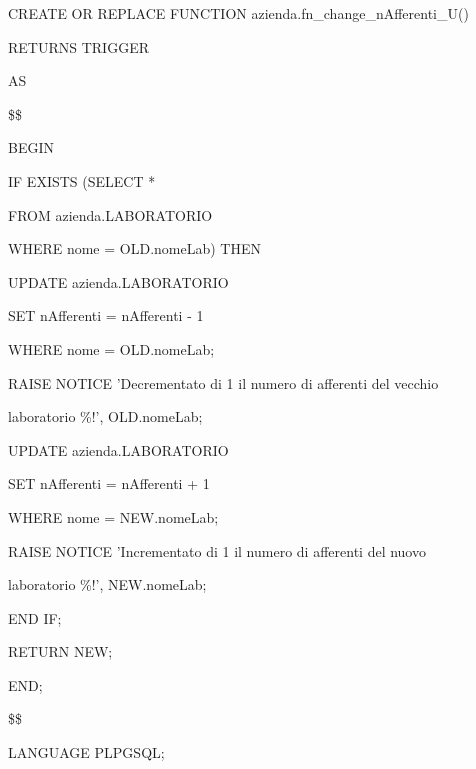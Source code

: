     \ttfamily
        \begin{flushleft}
            \begin{description}
                \item CREATE OR REPLACE FUNCTION azienda.fn\_change\_nAfferenti\_U()
                \item RETURNS TRIGGER
                \item AS
                \item \$\$
                \item BEGIN
                \begin{description}
                    \item IF EXISTS (SELECT *
                    \item \hspace{1.85cm} FROM azienda.LABORATORIO
                    \item \hspace{1.85cm} WHERE nome = OLD.nomeLab) THEN
                    \vspace{0.455cm}
                    \begin{description}
                        \item UPDATE azienda.LABORATORIO
                        \item SET nAfferenti = nAfferenti - 1
                        \item WHERE nome = OLD.nomeLab;
                        \item
                        \item RAISE NOTICE 'Decrementato di 1 il numero di afferenti del vecchio
                        \item \hspace{2.3cm} laboratorio \%!', OLD.nomeLab;
                        \item 
                        \item UPDATE azienda.LABORATORIO
                        \item SET nAfferenti = nAfferenti + 1
                        \item WHERE nome = NEW.nomeLab;
                        \item 
                        \item RAISE NOTICE 'Incrementato di 1 il numero di afferenti del nuovo 
                        \item \hspace{2.3cm} laboratorio \%!', NEW.nomeLab;
                    \end{description}
                    \item END IF;
                    \item 
                    \item RETURN NEW;
                \end{description}
                \item END;
                \item \$\$
                \item LANGUAGE PLPGSQL;
            \end{description}
        \end{flushleft}
    \normalfont

